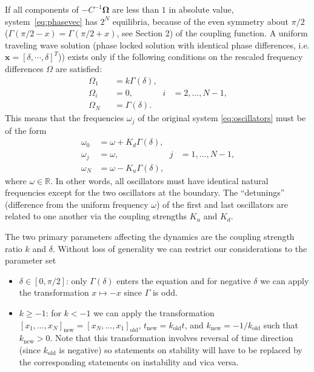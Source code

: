 \documentclass[aps,pre,twocolumn,a4paper,showkeys,showpacs]{revtex4}\usepackage{color}
\theoremstyle{plain}
\theoremstyle{plain}
\begin{document}
If all components of $-C^{-1}\mathbf{\mathbf{\Omega}}$ are less than $1$ in
absolute value, system~\eqref{eq:phasevec} has $2^{N}$ equilibria, because of
the even symmetry about $\pi/2$ ($\Gamma(\pi/2-x)=\Gamma(\pi/2+x)$, see
Section 2) of the coupling function. A uniform traveling wave solution (phase
locked solution with identical phase differences, i.e. $\mathbf{x}=[\delta,\cdots,\delta]^{T}$)) exists only if the following conditions
on the rescaled frequency differences $\Omega$ are satisfied:
\begin{equation}
\begin{aligned}\Omega_{1\,\phantom{-1}} & =k\Gamma(\delta)\mbox{,}\\ \Omega_{i\ \phantom{-1}} & =0\mbox{,} & i & =2,\dots,N-1\mbox{,}\\ \Omega_N & =\Gamma(\delta)\mbox{.}\end{aligned}\label{eq:Omcond}\end{equation}
This means that the frequencies $\omega_{j}$ of the original system
\eqref{eq:oscillators} must be of the form
\begin{equation}
\begin{aligned}\omega_{0} & =\omega+K_{d}\Gamma(\delta)\mbox{,}\\ \omega_{j} & =\omega\mbox{,} & j & =1,\dots,N-1\mbox{,}\\ \omega_{N} & =\omega-K_{u}\Gamma(\delta)\mbox{,}\end{aligned}\label{eq:omegacond}\end{equation}
where $\omega\in\mathbb{R}$. In other words, all oscillators must have
identical natural frequencies except for the two oscillators at the boundary.
The {}``detunings'' (difference from the uniform frequency $\omega$) of the
first and last oscillators are related to one another via the coupling
strengths $K_{u}$ and $K_{d}$.

The two primary parameters affecting the dynamics are the coupling strength
ratio $k$ and $\delta$. Without loss of generality we can restrict our
considerations to the parameter set

\begin{itemize}
\item $\delta\in[0,\pi/2]$: only $\Gamma(\delta)$ enters the equation  and for
negative $\delta$ we can apply the transformation  $x\mapsto-x$ since $\Gamma$
is odd.

\item $k\geq-1$: for $k<-1$ we can apply the transformation  $[x_{1},\ldots,x_{N}]_{\mathrm{new}}=[x_{N},\ldots,x_{1}]_{\mathrm{old}}$,
$t_{\mathrm{new}}=k_{\mathrm{old}}t$, and  $k_{\mathrm{new}}=-1/k_{\mathrm{old}}$ such that  $k_{\mathrm{new}}>0$. Note that this
transformation involves  reversal of time direction (since $k_{\mathrm{old}}$
is negative) so  statements on stability will have to be replaced by the
corresponding statements on instability and vica versa.
\end{itemize}
\end{document}
